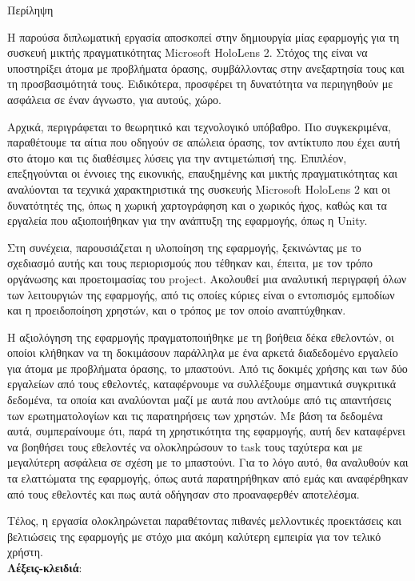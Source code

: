 \pagestyle{plain}
\begin{center}
{\LARGE Περίληψη}\\[1cm]
\end{center}

\setlength{\parindent}{0pt}
Η παρούσα διπλωματική εργασία αποσκοπεί στην δημιουργία μίας εφαρμογής για τη συσκευή μικτής πραγματικότητας Microsoft HoloLens 2. Στόχος της είναι να υποστηρίξει άτομα με προβλήματα όρασης, συμβάλλοντας στην ανεξαρτησία τους και τη προσβασιμότητά τους. Ειδικότερα, προσφέρει τη δυνατότητα να περιηγηθούν με ασφάλεια σε έναν άγνωστο, για αυτούς, χώρο.

Αρχικά, περιγράφεται το θεωρητικό και τεχνολογικό υπόβαθρο. Πιο συγκεκριμένα, παραθέτουμε τα αίτια που οδηγούν σε απώλεια όρασης, τον αντίκτυπο που έχει αυτή στο άτομο και τις διαθέσιμες λύσεις για την αντιμετώπισή της. Επιπλέον, επεξηγούνται οι έννοιες της εικονικής, επαυξημένης και μικτής πραγματικότητας και αναλύονται τα τεχνικά χαρακτηριστικά της συσκευής Microsoft HoloLens 2 και οι δυνατότητές της, όπως η χωρική χαρτογράφηση και ο χωρικός ήχος, καθώς και τα εργαλεία που αξιοποιήθηκαν για την ανάπτυξη της εφαρμογής, όπως η Unity.

Στη συνέχεια, παρουσιάζεται η υλοποίηση της εφαρμογής, ξεκινώντας με το σχεδιασμό αυτής και τους περιορισμούς που τέθηκαν και, έπειτα, με τον τρόπο οργάνωσης και προετοιμασίας του project. Ακολουθεί μια αναλυτική περιγραφή όλων των λειτουργιών της εφαρμογής, από τις οποίες κύριες είναι ο εντοπισμός εμποδίων και η προειδοποίηση χρηστών, και ο τρόπος με τον οποίο αναπτύχθηκαν.

Η αξιολόγηση της εφαρμογής πραγματοποιήθηκε με τη βοήθεια δέκα εθελοντών, οι οποίοι κλήθηκαν να τη δοκιμάσουν παράλληλα με ένα αρκετά διαδεδομένο εργαλείο για άτομα με προβλήματα όρασης, το μπαστούνι. Από τις δοκιμές χρήσης και των δύο εργαλείων από τους εθελοντές, καταφέρνουμε να συλλέξουμε σημαντικά συγκριτικά δεδομένα, τα οποία και αναλύονται μαζί με αυτά που αντλούμε από τις απαντήσεις των ερωτηματολογίων και τις παρατηρήσεις των χρηστών. Με βάση τα δεδομένα αυτά, συμπεραίνουμε ότι, παρά τη χρηστικότητα της εφαρμογής, αυτή δεν καταφέρνει να βοηθήσει τους εθελοντές να ολοκληρώσουν το task τους ταχύτερα και με μεγαλύτερη ασφάλεια σε σχέση με το μπαστούνι. Για το λόγο αυτό, θα αναλυθούν και τα ελαττώματα της εφαρμογής, όπως αυτά παρατηρήθηκαν από εμάς και αναφέρθηκαν από τους εθελοντές και πως αυτά οδήγησαν στο προαναφερθέν αποτελέσμα.

Τέλος, η εργασία ολοκληρώνεται παραθέτοντας πιθανές μελλοντικές προεκτάσεις και βελτιώσεις της εφαρμογής με στόχο μια ακόμη καλύτερη εμπειρία για τον τελικό χρήστη.
\\[\baselineskip]
\textbf{Λέξεις-κλειδιά}: {\keywords}